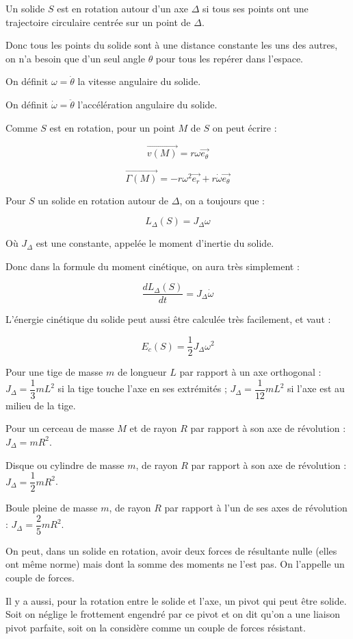 \documentclass[a4paper,12pt]{book}
\newcommand{\Def}[2]{\begin{tcolorbox}[colback=white,colframe=red!10!green!20!blue!75!, title=Définition : #1]#2\end{tcolorbox}}
\newcommand{\Thr}[2]{\begin{tcolorbox}[sharp corners, colback=white,colframe=red!10!blue!30!green!75!, title=Théorème : #1]#2\end{tcolorbox}}
\renewcommand{\Vec}[1]{\overrightarrow{#1}}
\begin{document}
\Def{Rotation}{Un solide $S$ est en rotation autour d'un axe $\Delta$ si tous ses points ont une trajectoire circulaire centrée sur un point de $\Delta$.
\par Donc tous les points du solide sont à une distance constante les uns des autres, on n'a besoin que d'un seul angle $\theta$ pour tous les repérer dans l'espace.
\par On définit $\omega = \dot{\theta}$ la vitesse angulaire du solide.
\par On définit $\dot{\omega}=\ddot{\theta}$ l'accélération angulaire du solide.
\par Comme $S$ est en rotation, pour un point $M$ de $S$ on peut écrire :
\par $$\Vec{v(M)} = r\omega \Vec{e_\theta}$$
\par $$\Vec{\Gamma(M)} = -r\omega^2\Vec{e_r} + r\dot{\omega}\Vec{e_\theta}$$}
\Def{Moment d'inertie}{Pour $S$ un solide en rotation autour de $\Delta$, on a toujours que :
\par $$L_\Delta(S) = J_\Delta\omega$$
\par Où $J_\Delta$ est une constante, appelée le moment d'inertie du solide.
\par Donc dans la formule du moment cinétique, on aura très simplement :
\par $$\dfrac{dL_\Delta(S)}{dt}=J_\Delta\dot{\omega}$$
\par L'énergie cinétique du solide peut aussi être calculée très facilement, et vaut :
\par $$ E_c(S) = \frac{1}{2}J_\Delta\omega^2$$}
\Thr{Exemples de moments d'inertie}{Pour une tige de masse $m$ de longueur $L$ par rapport à un axe orthogonal : $J_\Delta = \dfrac{1}{3}mL^2$ si la tige touche l'axe en ses extrémités ; $J_\Delta = \dfrac{1}{12}mL^2$ si l'axe est au milieu de la tige.
\par Pour un cerceau de masse $M$ et de rayon $R$ par rapport à son axe de révolution : $J_\Delta=mR^2$.
\par Disque ou cylindre de masse $m$, de rayon $R$ par rapport à son axe de révolution : $J_\Delta = \dfrac{1}{2}mR^2$.
\par Boule pleine de masse $m$, de rayon $R$ par rapport à l'un de ses axes de révolution : $J_\Delta = \dfrac{2}{5}mR^2$.}
\Def{Forces à considérer}{On peut, dans un solide en rotation, avoir deux forces de résultante nulle (elles ont même norme) mais dont la somme des moments ne l'est pas. On l'appelle un couple de forces.
\par Il y a aussi, pour la rotation entre le solide et l'axe, un pivot qui peut être solide. Soit on néglige le frottement engendré par ce pivot et on dit qu'on a une liaison pivot parfaite, soit on la considère comme un couple de forces résistant.}
\end{document}

